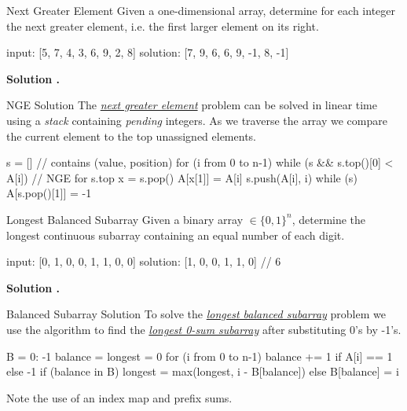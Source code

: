 \documentclass{cognito}
\begin{document}
\begin{note}{Next Greater Element}
	Given a one-dimensional array, determine for each integer
	the next greater element, i.e. the first larger element on its right.
	
	\begin{largecode}
 input:    [5, 7, 4, 3, 6,  9, 2,  8]
 solution: [7, 9, 6, 6, 9, -1, 8, -1]
	\end{largecode}
	\bf Solution \hyperref[note:NGE Solution]{\solutionref}.
\end{note}

\begin{note}{NGE Solution}
	The \hyperref[note:Next Greater Element]{\it next greater element} problem can be solved in linear time using a \emph{stack}
	containing \emph{pending} integers. As we traverse the array we compare the current element
	to the top unassigned elements.
	\begin{largecode}
 s = []  // contains (value, position)
 for (i from 0 to n-1)
 	while (s && s.top()[0] < A[i])  // NGE for s.top
		x = s.pop()
		A[x[1]] = A[i]
	s.push(A[i], i)
while (s) A[s.pop()[1]] = -1
	\end{largecode}
	\vspace{-5pt}
\end{note}

\begin{note}{Longest Balanced Subarray}
	Given a binary array $\in \{0, 1\}^n$, determine the longest
	continuous subarray containing an equal number of each digit.
	
	\begin{largecode}
 input: [0, 1, 0, 0, 1, 1, 0, 0]
 solution: [1, 0, 0, 1, 1, 0]  // 6
	\end{largecode}
	\bf Solution \hyperref[note:Balanced Subarray Solution]{\solutionref}.
\end{note}

\begin{note}{Balanced Subarray Solution}
	To solve the \hyperref[note:Longest Balanced Subarray]{\it longest balanced subarray} problem
	we use the algorithm to find the \hyperref[note:Longest k-Sum Subarray Solution]{\it longest 0-sum subarray}
	after substituting 0's by -1's.
	\begin{largecode}
 B = {0: -1}
 balance = longest = 0
 for (i from 0 to n-1)
 	balance += 1 if A[i] == 1 else -1
	if (balance in B)
		longest = max(longest, i - B[balance])
	else B[balance] = i
	\end{largecode}
	\begin{remark} Note the use of an index map and prefix sums. \end{remark}
	\vspace{-5pt}
\end{note}
\end{document}
